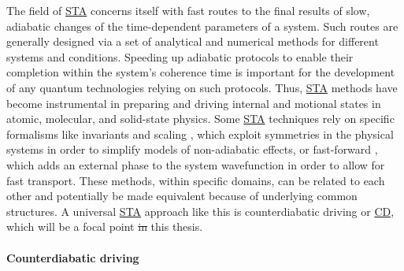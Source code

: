 \documentclass[a4paper,oneside,11pt]{book}
\newcommand{\acrref}[1]{\hyperref[acr:#1]{#1}}
\providecommand{\DIFaddtex}[1]{{\protect\color{blue}\uwave{#1}}} %
\providecommand{\DIFdeltex}[1]{{\protect\color{red}\sout{#1}}}                      %
\providecommand{\DIFaddbegin}{} %
\providecommand{\DIFaddend}{} %
\providecommand{\DIFdelbegin}{} %
\providecommand{\DIFdelend}{} %
\providecommand{\DIFadd}[1]{\texorpdfstring{\DIFaddtex{#1}}{#1}} %
\providecommand{\DIFdel}[1]{\texorpdfstring{\DIFdeltex{#1}}{}} %
\newcommand{\DIFscaledelfig}{0.5}
\newlength{\DIFdelgraphicswidth} %
\newlength{\DIFdelgraphicsheight} %
\newcommand{\DIFaddincludegraphics}[2][]{{\color{blue}\fbox{\DIFOincludegraphics[#1]{#2}}}} %
\newcommand{\DIFdelincludegraphics}[2][]{%
\sbox{\DIFdelgraphicsbox}{\DIFOincludegraphics[#1]{#2}}%
\settoboxwidth{\DIFdelgraphicswidth}{\DIFdelgraphicsbox} %
\settoboxtotalheight{\DIFdelgraphicsheight}{\DIFdelgraphicsbox} %
\scalebox{\DIFscaledelfig}{%
\parbox[b]{\DIFdelgraphicswidth}{\usebox{\DIFdelgraphicsbox}\\[-\baselineskip] \rule{\DIFdelgraphicswidth}{0em}}\llap{\resizebox{\DIFdelgraphicswidth}{\DIFdelgraphicsheight}{%
\setlength{\unitlength}{\DIFdelgraphicswidth}%
\begin{picture}(1,1)%
\thicklines\linethickness{2pt} %
{\color[rgb]{1,0,0}\put(0,0){\framebox(1,1){}}}%
{\color[rgb]{1,0,0}\put(0,0){\line( 1,1){1}}}%
{\color[rgb]{1,0,0}\put(0,1){\line(1,-1){1}}}%
\end{picture}%
}\hspace*{3pt}}} %
} %
\DeclareRobustCommand{\DIFaddbegin}{\DIFOaddbegin \let\includegraphics\DIFaddincludegraphics} %
\DeclareRobustCommand{\DIFaddend}{\DIFOaddend \let\includegraphics\DIFOincludegraphics} %
\DeclareRobustCommand{\DIFdelbegin}{\DIFOdelbegin \let\includegraphics\DIFdelincludegraphics} %
\DeclareRobustCommand{\DIFdelend}{\DIFOaddend \let\includegraphics\DIFOincludegraphics} %
\begin{document}
The field of \acrref{STA} concerns itself with fast routes to the final results of slow, adiabatic changes of the time-dependent parameters of a system. Such routes are generally designed via a set of analytical and numerical methods for different systems and conditions. Speeding up adiabatic protocols to enable their completion within the system’s coherence time is important
for the development of any quantum technologies relying on such protocols. Thus, \acrref{STA} methods have become instrumental in preparing and driving internal and motional states in atomic, molecular, and solid-state physics. Some \acrref{STA} techniques rely on specific formalisms like invariants and scaling \cite{deffner_classical_2014, deng_superadiabatic_2018, chen_fast_2010}, which exploit symmetries in the physical systems in order to simplify models of non-adiabatic effects, or fast-forward \cite{masuda_fast-forward_2009, masuda_fast-forward_2008}, which adds an external phase to the system wavefunction in order to allow for fast transport. These methods, within specific domains, can be related to each other and potentially be made equivalent because of underlying common structures. A universal \acrref{STA} approach like this is counterdiabatic driving or \acrref{CD}, which will be a focal point \DIFdelbegin \DIFdel{in }\DIFdelend \DIFaddbegin \DIFadd{of }\DIFaddend this thesis. 

\paragraph*{Counterdiabatic driving}
\end{document}
